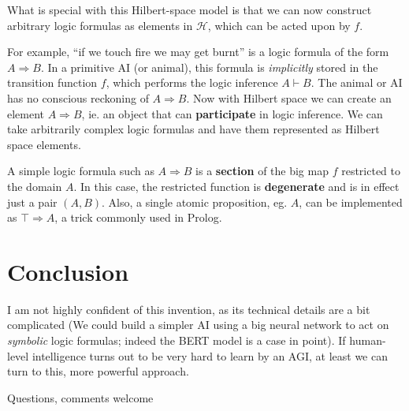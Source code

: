 What is special with this Hilbert-space model is that we can now construct arbitrary logic formulas as elements in $\mathcal{H}$, which can be acted upon by $f$.

For example, ``if we touch fire we may get burnt'' is a logic formula of the form $A \Rightarrow B$.  In a primitive AI (or animal), this formula is \textit{implicitly} stored in the transition function $f$, which performs the logic inference $A \vdash B$.  The animal or AI has no conscious reckoning of $A \Rightarrow B$.  Now with Hilbert space we can create an element $A \Rightarrow B$, ie. an object that can \textbf{participate} in logic inference.  We can take arbitrarily complex logic formulas and have them represented as Hilbert space elements.

A simple logic formula such as $A \Rightarrow B$ is a \textbf{section} of the big map $f$ restricted to the domain $A$.  In this case, the restricted function is \textbf{degenerate} and is in effect just a pair $(A, B)$.  Also, a single atomic proposition, eg. $A$, can be implemented as $\top \Rightarrow A$, a trick commonly used in Prolog.

\section{Conclusion}

I am not highly confident of this invention, as its technical details are a bit complicated (We could build a simpler AI using a big neural network to act on \textit{symbolic} logic formulas; indeed the BERT model is a case in point).  If human-level intelligence turns out to be very hard to learn by an AGI, at least we can turn to this, more powerful approach.

Questions, comments welcome \smiley

